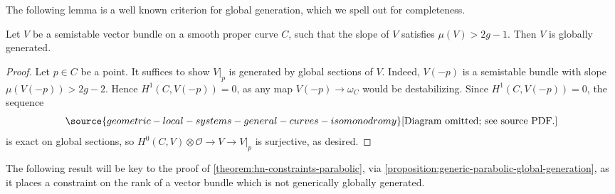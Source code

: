 The following lemma is a well known criterion for global generation, which we
spell out for completeness.
\begin{lemma}
\notready
	\label{lemma:global-generation}
	Let $V$ be a semistable vector bundle on a smooth proper curve $C$, such that the slope of $V$ satisfies $\mu(V)> 2g - 1$. Then
	$V$ is globally generated.
\end{lemma}
\begin{proof}
	Let $p\in C$ be a point. It suffices to show $V|_p$ is generated by global sections of $V$. Indeed, $V(-p)$ is a semistable bundle with slope $\mu(V(-p)) > 2g-2$. Hence
	 $H^1(C, V(-p)) = 0$, as any map $V(-p) \to \omega_C$ would be
	destabilizing.
	Since $H^1(C, V(-p)) = 0$, the sequence
	\begin{equation}
		\label{equation:}
\source{geometric-local-systems-general-curves-isomonodromy}
		\text{[Diagram omitted; see source PDF.]}\end{equation}
	is exact on global sections, so
	$H^0(C, V) \otimes \mathscr O \to V \to V|_p$ is surjective, as desired.
\end{proof}

The following result will be key to the proof of
\autoref{theorem:hn-constraints-parabolic}, via
\autoref{proposition:generic-parabolic-global-generation},
as it places a constraint on the rank of a
vector bundle which is not generically globally generated.

